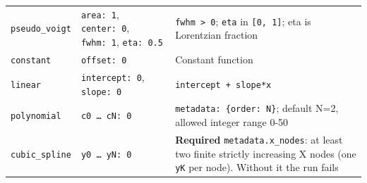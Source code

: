 \documentclass[
  10pt,
  a4paper,
  oneside]{scrreprt}
\begin{document}
\begin{longtable}[]{@{}lll@{}}
\begin{minipage}[t]{0.30\columnwidth}
\texttt{pseudo\_voigt}\strut
\end{minipage} & \begin{minipage}[t]{0.30\columnwidth}\raggedright
\texttt{area:\ 1}, \texttt{center:\ 0}, \texttt{fwhm:\ 1},
\texttt{eta:\ 0.5}\strut
\end{minipage} & \begin{minipage}[t]{0.30\columnwidth}\raggedright
\texttt{fwhm\ \textgreater{}\ 0}; \texttt{eta} in \texttt{{[}0,\ 1{]}};
eta is Lorentzian fraction\strut
\end{minipage}\tabularnewline
\begin{minipage}[t]{0.30\columnwidth}\raggedright
\texttt{constant}\strut
\end{minipage} & \begin{minipage}[t]{0.30\columnwidth}\raggedright
\texttt{offset:\ 0}\strut
\end{minipage} & \begin{minipage}[t]{0.30\columnwidth}\raggedright
Constant function\strut
\end{minipage}\tabularnewline
\begin{minipage}[t]{0.30\columnwidth}\raggedright
\texttt{linear}\strut
\end{minipage} & \begin{minipage}[t]{0.30\columnwidth}\raggedright
\texttt{intercept:\ 0}, \texttt{slope:\ 0}\strut
\end{minipage} & \begin{minipage}[t]{0.30\columnwidth}\raggedright
\texttt{intercept\ +\ slope*x}\strut
\end{minipage}\tabularnewline
\begin{minipage}[t]{0.30\columnwidth}\raggedright
\texttt{polynomial}\strut
\end{minipage} & \begin{minipage}[t]{0.30\columnwidth}\raggedright
\texttt{c0\ \ldots{}\ cN:\ 0}\strut
\end{minipage} & \begin{minipage}[t]{0.30\columnwidth}\raggedright
\texttt{metadata:\ \{order:\ N\}}; default N=2, allowed integer range
0-50\strut
\end{minipage}\tabularnewline
\begin{minipage}[t]{0.30\columnwidth}\raggedright
\texttt{cubic\_spline}\strut
\end{minipage} & \begin{minipage}[t]{0.30\columnwidth}\raggedright
\texttt{y0\ \ldots{}\ yN:\ 0}\strut
\end{minipage} & \begin{minipage}[t]{0.30\columnwidth}\raggedright
\textbf{Required} \texttt{metadata.x\_nodes}: at least two finite
strictly increasing X nodes (one \texttt{yK} per node). Without it the
run fails\strut
\end{minipage}\tabularnewline
\bottomrule
\end{longtable}
\end{document}
